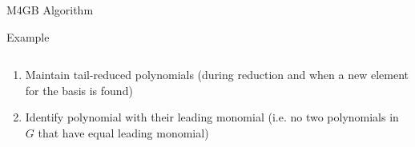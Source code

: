 \documentclass{beamer}
\begin{document}
\begin{section}{M4GB Algorithm}
\begin{frame}{Example}
\begin{columns}[T]
\begin{column}
\begin{scriptsize}
          \vspace{5mm}
        \end{scriptsize}
      \end{column}
    \end{columns}
  \end{frame}

  \begin{frame}
    \begin{enumerate}
    \item Maintain tail-reduced polynomials (during reduction and when a new element for the basis is found)
      \item Identify polynomial with their leading monomial (i.e. no two polynomials in $G$ that have equal leading monomial)
    \end{enumerate}
  \end{frame}


\end{section}
\end{document}
